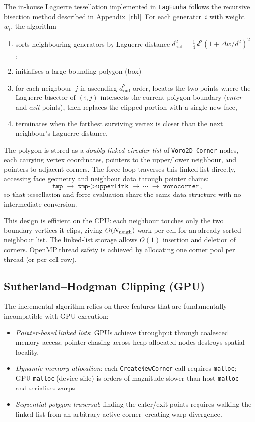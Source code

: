 \documentclass[twocolumn]{aastex63}
\newcommand{\lageunha}{\texttt{LagEunha}}
\begin{document}
The in-house Laguerre tessellation implemented in \lageunha{} follows
the recursive bisection method described in Appendix~\ref{rbl}.  For
each generator~$i$ with weight $w_i$, the algorithm
\begin{enumerate}[nosep]
  \item sorts neighbouring generators by Laguerre distance
    $d_{\mathrm{rad}}^2 = \tfrac{1}{4}\,d^2(1+\Delta w/d^2)^2$,
  \item initialises a large bounding polygon (box),
  \item for each neighbour~$j$ in ascending $d_{\mathrm{rad}}^2$
    order, locates the two points where the Laguerre bisector of
    $(i,j)$ intersects the current polygon boundary (\emph{enter}
    and \emph{exit} points), then replaces the clipped portion with
    a single new face,
  \item terminates when the farthest surviving vertex is closer than
    the next neighbour's Laguerre distance.
\end{enumerate}
The polygon is stored as a \emph{doubly-linked circular list}
of \texttt{Voro2D\_Corner} nodes, each carrying vertex coordinates,
pointers to the upper/lower neighbour, and pointers to adjacent
corners.  The force loop traverses this linked list directly,
accessing face geometry and neighbour data through pointer chains:
\begin{equation}
  \texttt{tmp} \;\to\; \texttt{tmp->upperlink} \;\to\; \cdots
  \;\to\; \texttt{vorocorner}\,,
  \label{eq:lltraversal}
\end{equation}
so that tessellation and force evaluation share the same data
structure with no intermediate conversion.

This design is efficient on the CPU: each neighbour touches only the
two boundary vertices it clips, giving $O(N_{\rm neigh})$ work per
cell for an already-sorted neighbour list.  The linked-list storage
allows $O(1)$ insertion and deletion of corners.  OpenMP thread
safety is achieved by allocating one corner pool per thread
(or per cell-row).

\subsection{Sutherland--Hodgman Clipping (GPU)}

The incremental algorithm relies on three features that are
fundamentally incompatible with GPU execution:
\begin{itemize}[nosep]
  \item \emph{Pointer-based linked lists}: GPUs achieve throughput
    through coalesced memory access; pointer chasing across
    heap-allocated nodes destroys spatial locality.
  \item \emph{Dynamic memory allocation}: each
    \texttt{CreateNewCorner} call requires \texttt{malloc}; GPU
    \texttt{malloc} (device-side) is orders of magnitude slower
    than host \texttt{malloc} and serialises warps.
  \item \emph{Sequential polygon traversal}: finding the enter/exit
    points requires walking the linked list from an arbitrary active
    corner, creating warp divergence.
\end{itemize}
\end{document}
